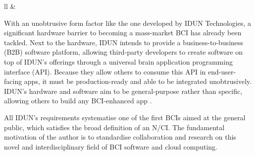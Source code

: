 \begin{table}[ht]
{\begin{tabular}{ll}
        &
                                                                                                               \\ \hline
    \end{tabular}%
  }
  \vspace{10pt}
  \caption{Axes label descriptions of the three-dimensionality for the definition of an N/CI as shown in \autoref{fig:nci-definition}.}
  \label{tab:nci-axis}
\end{table}

\newpage

With an unobtrusive form factor like the one developed by IDUN Technologies, a significant hardware barrier to becoming a mass-market BCI has already been tackled. Next to the hardware, IDUN intends to provide a business-to-business (B2B) software platform, allowing third-party developers to create software on top of IDUN’s offerings through a universal brain application programming interface (API). Because they allow others to consume this API in end-user-facing apps, it must be production-ready and able to be integrated unobtrusively. IDUN’s hardware and software aim to be general-purpose rather than specific, allowing others to build any BCI-enhanced app \citep{idun_guardian_nodate}.

All IDUN’s requirements systematise one of the first BCIs aimed at the general public, which satisfies the broad definition of an N/CI. The fundamental motivation of the author is to standardise collaboration and research on this novel and interdisciplinary field of BCI software and cloud computing.

